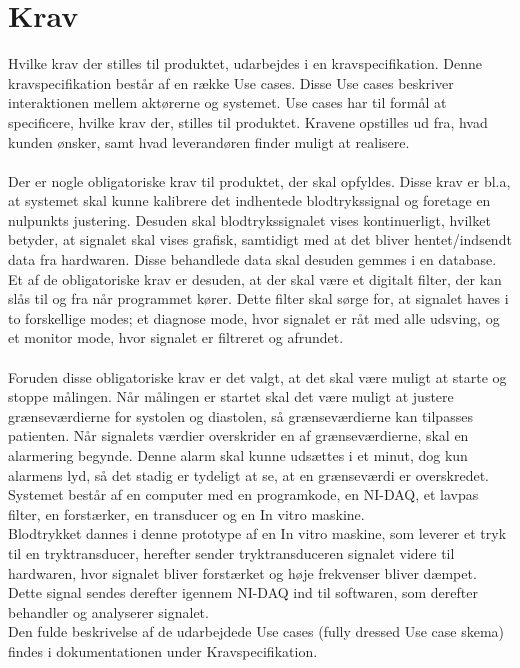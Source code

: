 \chapter{Krav}
Hvilke krav der stilles til produktet, udarbejdes i en kravspecifikation. Denne kravspecifikation består af en række Use cases. Disse Use cases beskriver interaktionen mellem aktørerne og systemet. Use cases har til formål at specificere, hvilke krav der, stilles til produktet. Kravene opstilles ud fra, hvad kunden ønsker, samt hvad leverandøren finder muligt at realisere. \\ \\
Der er nogle obligatoriske krav til produktet, der skal opfyldes. Disse krav er bl.a, at systemet skal kunne kalibrere det indhentede blodtrykssignal og foretage en nulpunkts justering. Desuden skal blodtrykssignalet vises kontinuerligt, hvilket betyder, at signalet skal vises grafisk, samtidigt med at det bliver hentet/indsendt data fra hardwaren. Disse behandlede data skal desuden gemmes i en database.
Et af de obligatoriske krav er desuden, at der skal være et digitalt filter, der kan slås til og fra når programmet kører. Dette filter skal sørge for, at signalet haves i to forskellige modes; et diagnose mode, hvor signalet er råt med alle udsving, og et monitor mode, hvor signalet er filtreret og afrundet.\\\\
Foruden disse obligatoriske krav er det valgt, at det skal være muligt at starte og stoppe målingen. Når målingen er startet skal det være muligt at justere grænseværdierne for systolen og diastolen, så grænseværdierne kan tilpasses patienten. Når signalets værdier overskrider en af grænseværdierne, skal en alarmering begynde. Denne alarm skal kunne udsættes i et minut, dog kun alarmens lyd, så det stadig er tydeligt at se, at en grænseværdi er overskredet.\\
Systemet består af en computer med en programkode, en NI-DAQ, et lavpas filter, en forstærker, en transducer og en In vitro maskine.\\
Blodtrykket dannes i denne prototype af en In vitro maskine, som leverer et tryk til en tryktransducer, herefter sender tryktransduceren signalet videre til hardwaren, hvor signalet bliver forstærket og høje frekvenser bliver dæmpet. Dette signal sendes derefter igennem NI-DAQ ind til softwaren, som derefter behandler og analyserer signalet.\\
Den fulde beskrivelse af de udarbejdede Use cases (fully dressed Use case skema) findes i dokumentationen under Kravspecifikation.
